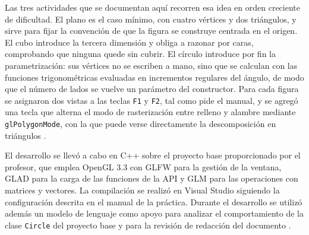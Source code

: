 Las tres actividades que se documentan aquí recorren esa idea en orden creciente de dificultad. El plano es el caso mínimo, con cuatro vértices y dos triángulos, y sirve para fijar la convención de que la figura se construye centrada en el origen. El cubo introduce la tercera dimensión y obliga a razonar por caras, comprobando que ninguna quede sin cubrir. El círculo introduce por fin la parametrización: sus vértices no se escriben a mano, sino que se calculan con las funciones trigonométricas evaluadas en incrementos regulares del ángulo, de modo que el número de lados se vuelve un parámetro del constructor. Para cada figura se asignaron dos vistas a las teclas \texttt{F1} y \texttt{F2}, tal como pide el manual, y se agregó una tecla que alterna el modo de rasterización entre relleno y alambre mediante \texttt{glPolygonMode}, con la que puede verse directamente la descomposición en triángulos \cite{khronos_polygonmode}.

El desarrollo se llevó a cabo en C++ sobre el proyecto base proporcionado por el profesor, que emplea OpenGL 3.3 con GLFW para la gestión de la ventana, GLAD para la carga de las funciones de la API y GLM para las operaciones con matrices y vectores. La compilación se realizó en Visual Studio siguiendo la configuración descrita en el manual de la práctica. Durante el desarrollo se utilizó además un modelo de lenguaje como apoyo para analizar el comportamiento de la clase \texttt{Circle} del proyecto base y para la revisión de redacción del documento \cite{anthropic2026}.
